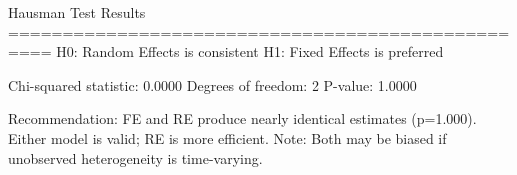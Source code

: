 
Hausman Test Results
==================================================
H0: Random Effects is consistent
H1: Fixed Effects is preferred

Chi-squared statistic: 0.0000
Degrees of freedom: 2
P-value: 1.0000

Recommendation: FE and RE produce nearly identical estimates (p=1.000). Either model is valid; RE is more efficient. Note: Both may be biased if unobserved heterogeneity is time-varying.
